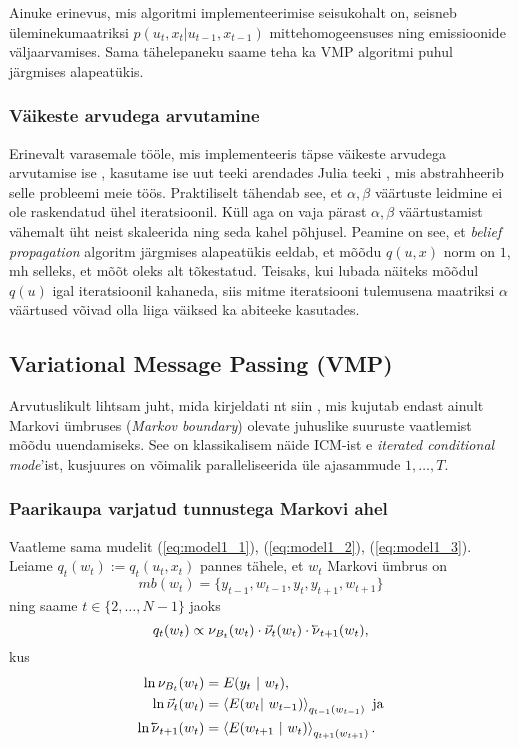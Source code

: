 Ainuke erinevus, mis algoritmi implementeerimise seisukohalt on, seisneb üleminekumaatriksi $p(u_t,x_t|u_{t-1},x_{t-1})$ mittehomogeensuses ning emissioonide väljaarvamises. Sama tähelepaneku saame teha ka VMP algoritmi puhul järgmises alapeatükis.

\subsubsection{Väikeste arvudega arvutamine}

Erinevalt varasemale tööle, mis implementeeris täpse väikeste arvudega arvutamise ise \parencite{Soop.2023}, kasutame ise uut teeki \parencite{Pihel.2024} arendades Julia teeki \parencite{Rowley.2024}, mis abstrahheerib selle probleemi meie töös. Praktiliselt tähendab see, et $\alpha, \beta$ väärtuste leidmine ei ole raskendatud ühel iteratsioonil. Küll aga on vaja pärast $\alpha, \beta$ väärtustamist vähemalt üht neist skaleerida ning seda kahel põhjusel. Peamine on see, et \emph{belief propagation} algoritm järgmises alapeatükis eeldab, et mõõdu $q(u,x)$ norm on $1$, mh selleks, et mõõt oleks alt tõkestatud. Teisaks, kui lubada näiteks mõõdul $q(u)$ igal iteratsioonil kahaneda, siis mitme iteratsiooni tulemusena maatriksi $\alpha$ väärtused võivad olla liiga väiksed ka abiteeke kasutades.

\subsection{Variational Message Passing (VMP)}

Arvutuslikult lihtsam juht, mida kirjeldati nt siin \parencite{Parr.2019}, mis kujutab endast ainult Markovi ümbruses (\textit{Markov boundary}) olevate juhuslike suuruste vaatlemist mõõdu uuendamiseks.
See on klassikalisem näide ICM-ist e \emph{iterated conditional mode}'ist, kusjuures on võimalik paralleliseerida üle ajasammude $1, \ldots, T$.

\subsubsection{Paarikaupa varjatud tunnustega Markovi ahel}

Vaatleme sama mudelit (\ref{eq:model1_1}), (\ref{eq:model1_2}), (\ref{eq:model1_3}). Leiame $q_t(w_t) := q_t(u_t,x_t)$ pannes tähele, et $w_t$ Markovi ümbrus on
$$mb(w_t) = \{y_{t-1},w_{t-1},y_t,y_{t+1},w_{t+1} \}$$
ning saame $t \in \{2,\ldots,N-1\}$ jaoks
$$q_t(w_t) \propto \nu_{B_t}(w_t) \cdot \vec{\nu}_{t}(w_t) \cdot \cev{\nu}_{t+1}(w_t),
$$
kus
\begin{align*}
    \ln \nu_{B_t}(w_t) &= E(y_t\ |\ w_t),\\
    \ln \vec{\nu}_{t}(w_t) &= \left< E(w_t |\ w_{t-1}) \right>_{q_{t-1}(w_{t-1})} \text{ ja}\\
    \ln \cev{\nu}_{t+1}(w_t) &= \left< E(w_{t+1}\ |\ w_t) \right>_{q_{t+1}(w_{t+1})}.
\end{align*}

